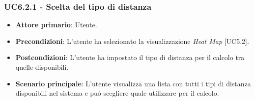 \subsubsection{UC6.2.1 - Scelta del tipo di distanza}
\begin{itemize}
	\item \textbf{Attore primario}: Utente.
	\item \textbf{Precondizioni}: L'utente ha selezionato la visualizzazione \textit{Heat Map} [UC5.2].
	\item \textbf{Postcondizioni}: L'utente ha impostato il tipo di distanza per il calcolo tra quelle disponibili.
	
	\item \textbf{Scenario principale}: L'utente visualizza una lista con tutti i tipi di distanza disponibili nel sistema e può scegliere quale utilizzare per il calcolo.
\end{itemize}